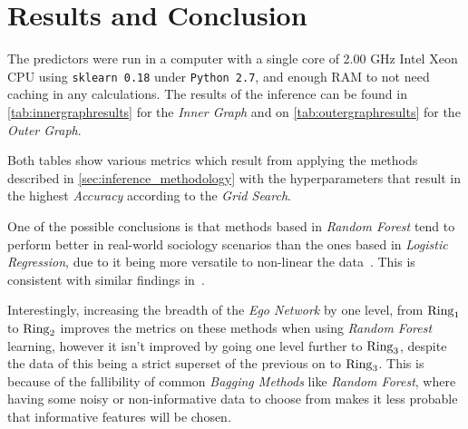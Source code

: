\section{Results and Conclusion}
\label{sec:results}


The predictors were run in a computer with a single core of 2.00 GHz Intel Xeon CPU using \texttt{sklearn 0.18} under \texttt{Python 2.7}, and enough RAM to not need caching in any calculations. The results of the inference can be found in \cref{tab:innergraphresults} for the \emph{Inner Graph} and on \cref{tab:outergraphresults} for the \emph{Outer Graph}.


Both tables show various metrics which result from applying the methods described in \cref{sec:inference_methodology} with the hyperparameters that result in the highest \emph{Accuracy} according to the \emph{Grid Search}.

One of the possible conclusions is that methods based in \emph{Random Forest} tend to perform better in real-world sociology scenarios than the ones based in \emph{Logistic Regression}, due to it being more versatile to non-linear the data~\cite{logisticvsdecision}. This is consistent with similar findings in~\cite{muchlinski2016}.

Interestingly, increasing the breadth of the \emph{Ego Network} by one level, from $\operatorname{Ring}_1$ to $\operatorname{Ring}_2$ improves the metrics on these methods when using \emph{Random Forest} learning, however it isn't improved by going one level further to $\operatorname{Ring}_3$, despite the data of this being a strict superset of the previous on to $\operatorname{Ring}_3$. This is because of the fallibility of common \emph{Bagging Methods} like \emph{Random Forest}, where having some noisy or non-informative data to choose from makes it less probable that informative features will be chosen.

